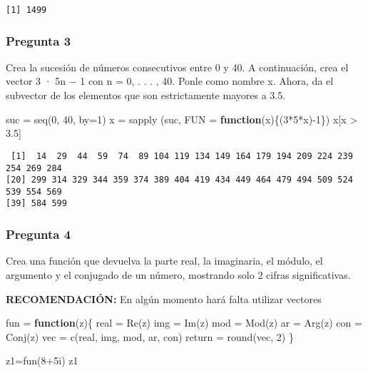 \documentclass[
]{article}
\newenvironment{Shaded}{\begin{snugshade}}{\end{snugshade}}
\newcommand{\AttributeTok}[1]{\textcolor[rgb]{0.77,0.63,0.00}{#1}}
\newcommand{\ControlFlowTok}[1]{\textcolor[rgb]{0.13,0.29,0.53}{\textbf{#1}}}
\newcommand{\DecValTok}[1]{\textcolor[rgb]{0.00,0.00,0.81}{#1}}
\newcommand{\FloatTok}[1]{\textcolor[rgb]{0.00,0.00,0.81}{#1}}
\newcommand{\FunctionTok}[1]{\textcolor[rgb]{0.00,0.00,0.00}{#1}}
\newcommand{\NormalTok}[1]{#1}
\newcommand{\OtherTok}[1]{\textcolor[rgb]{0.56,0.35,0.01}{#1}}
\newcommand{\SpecialCharTok}[1]{\textcolor[rgb]{0.00,0.00,0.00}{#1}}
\begin{document}
\begin{verbatim}
[1] 1499
\end{verbatim}

\hypertarget{pregunta-3}{%
\subsubsection{Pregunta 3}\label{pregunta-3}}

Crea la sucesión de números consecutivos entre 0 y 40. A continuación,
crea el vector 3 · 5n − 1 con n = 0, . . . , 40. Ponle como nombre x.
Ahora, da el subvector de los elementos que son estrictamente mayores a
3.5.

\begin{Shaded}
\begin{Highlighting}[]
\NormalTok{suc }\OtherTok{=} \FunctionTok{seq}\NormalTok{(}\DecValTok{0}\NormalTok{, }\DecValTok{40}\NormalTok{, }\AttributeTok{by=}\DecValTok{1}\NormalTok{)}
\NormalTok{x }\OtherTok{=} \FunctionTok{sapply}\NormalTok{ (suc, }\AttributeTok{FUN =} \ControlFlowTok{function}\NormalTok{(x)\{(}\DecValTok{3}\SpecialCharTok{*}\DecValTok{5}\SpecialCharTok{*}\NormalTok{x)}\SpecialCharTok{{-}}\DecValTok{1}\NormalTok{\}) }
\NormalTok{x[x }\SpecialCharTok{\textgreater{}} \FloatTok{3.5}\NormalTok{]}
\end{Highlighting}
\end{Shaded}

\begin{verbatim}
 [1]  14  29  44  59  74  89 104 119 134 149 164 179 194 209 224 239 254 269 284
[20] 299 314 329 344 359 374 389 404 419 434 449 464 479 494 509 524 539 554 569
[39] 584 599
\end{verbatim}

\hypertarget{pregunta-4}{%
\subsubsection{Pregunta 4}\label{pregunta-4}}

Crea una función que devuelva la parte real, la imaginaria, el módulo,
el argumento y el conjugado de un número, mostrando solo 2 cifras
significativas.

\textbf{RECOMENDACIÓN:} En algún momento hará falta utilizar vectores

\begin{Shaded}
\begin{Highlighting}[]
\NormalTok{fun }\OtherTok{=} \ControlFlowTok{function}\NormalTok{(z)\{}
\NormalTok{  real }\OtherTok{=} \FunctionTok{Re}\NormalTok{(z)}
\NormalTok{  img }\OtherTok{=} \FunctionTok{Im}\NormalTok{(z)}
\NormalTok{  mod }\OtherTok{=} \FunctionTok{Mod}\NormalTok{(z)}
\NormalTok{  ar }\OtherTok{=} \FunctionTok{Arg}\NormalTok{(z)}
\NormalTok{  con }\OtherTok{=} \FunctionTok{Conj}\NormalTok{(z)}
\NormalTok{  vec }\OtherTok{=} \FunctionTok{c}\NormalTok{(real, img, mod, ar, con)}
\NormalTok{  return }\OtherTok{=} \FunctionTok{round}\NormalTok{(vec, }\DecValTok{2}\NormalTok{)}
\NormalTok{\}}

\NormalTok{z1}\OtherTok{=}\FunctionTok{fun}\NormalTok{(}\DecValTok{8}\SpecialCharTok{+}\NormalTok{5i)}
\NormalTok{z1}
\end{Highlighting}
\end{Shaded}
\end{document}

